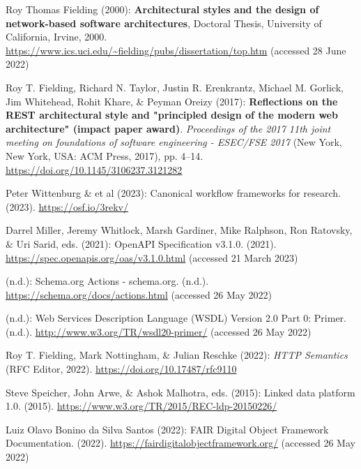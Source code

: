 \begin{thebibliography}{9}
Roy Thomas Fielding (2000): \textbf{Architectural styles and the design
of network-based software architectures}, Doctoral Thesis, {University
of California, Irvine}, 2000.
\url{https://www.ics.uci.edu/~fielding/pubs/dissertation/top.htm}
(accessed 28 June 2022)

Roy T. Fielding, Richard N. Taylor, Justin R. Erenkrantz, Michael M.
Gorlick, Jim Whitehead, Rohit Khare, \& Peyman Oreizy (2017):
\textbf{Reflections on the {REST} architectural style and "principled
design of the modern web architecture" (impact paper award)}.
\emph{Proceedings of the 2017 11th joint meeting on foundations of
software engineering - {ESEC}/{FSE} 2017} ({New York, New York, USA}:
{ACM Press}, 2017), pp. 4--14.
\url{https://doi.org/10.1145/3106237.3121282}

Peter Wittenburg \& et al (2023): Canonical workflow frameworks for
research. (2023). \url{https://osf.io/3rekv/}

Darrel Miller, Jeremy Whitlock, Marsh Gardiner, Mike Ralphson, Ron
Ratovsky, \& Uri Sarid, eds. (2021): {OpenAPI Specification} v3.1.0.
(2021). \url{https://spec.openapis.org/oas/v3.1.0.html} (accessed 21
March 2023)

(n.d.): Schema.org {Actions} - schema.org. (n.d.).
\url{https://schema.org/docs/actions.html} (accessed 26 May 2022)

(n.d.): Web {Services Description Language} ({WSDL}) {Version} 2.0
{Part} 0: {Primer}. (n.d.). \url{http://www.w3.org/TR/wsdl20-primer/}
(accessed 26 May 2022)

Roy T. Fielding, Mark Nottingham, \& Julian Reschke (2022): \emph{{HTTP
Semantics}} ({RFC Editor}, 2022).
\url{https://doi.org/10.17487/rfc9110}

Steve Speicher, John Arwe, \& Ashok Malhotra, eds. (2015): Linked data
platform 1.0. (2015). \url{https://www.w3.org/TR/2015/REC-ldp-20150226/}

Luiz Olavo Bonino da Silva Santos (2022): {FAIR Digital Object Framework
Documentation}. (2022). \url{https://fairdigitalobjectframework.org/}
(accessed 26 May 2022)


\end{thebibliography}

